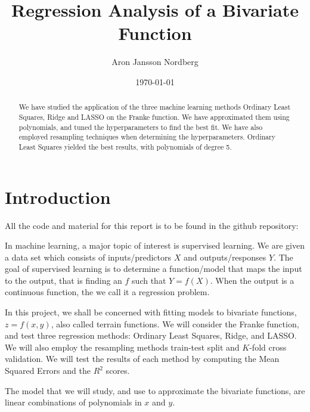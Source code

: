 \documentclass[reprint,english,notitlepage]{revtex4-1}  %
\begin{document}
\title{Regression Analysis of a Bivariate Function}   %
\author{Aron Jansson Nordberg}               %
\date{\today}                             %
\noaffiliation                            %
\begin{abstract}                          %
We have studied the application of the three machine learning methods Ordinary Least Squares, Ridge and LASSO on the Franke function. We have approximated them using polynomials, and tuned the hyperparameters to find the best fit. We have also employed resampling techniques when determining the hyperparameters. Ordinary Least Squares yielded the best results, with polynomials of degree 5.%
\end{abstract}                            %
\maketitle                                %


\section{Introduction}
All the code and material for this report is to be found in the github repository:

In machine learning, a major topic of interest is supervised learning. We are given a data set which consists of inputs/predictors $X$ and outputs/responses $Y$. The goal of supervised learning is to determine a function/model that maps the input to the output, that is finding an $f$ such that $Y = f(X)$. When the output is a continuous function, the we call it a regression problem.

In this project, we shall be concerned with fitting models to bivariate functions, $z = f(x, y)$, also called terrain functions. We will consider the Franke function, and test three regression methods: Ordinary Least Squares, Ridge, and LASSO. We will also employ the resampling methods train-test split and $K$-fold cross validation. We will test the results of each method by computing the Mean Squared Errors and the $R^2$ scores.

The model that we will study, and use to approximate the bivariate functions, are linear combinations of polynomials in $x$ and $y$.
\end{document}
